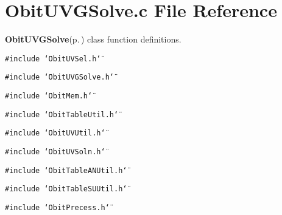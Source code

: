 \section{Obit\-UVGSolve.c File Reference}
\label{ObitUVGSolve_8c}
{\bf Obit\-UVGSolve}{\rm (p.\,\pageref{structObitUVGSolve})} class function definitions. 

{\tt \#include \char`\"{}Obit\-UVSel.h\char`\"{}}\par
{\tt \#include \char`\"{}Obit\-UVGSolve.h\char`\"{}}\par
{\tt \#include \char`\"{}Obit\-Mem.h\char`\"{}}\par
{\tt \#include \char`\"{}Obit\-Table\-Util.h\char`\"{}}\par
{\tt \#include \char`\"{}Obit\-UVUtil.h\char`\"{}}\par
{\tt \#include \char`\"{}Obit\-UVSoln.h\char`\"{}}\par
{\tt \#include \char`\"{}Obit\-Table\-ANUtil.h\char`\"{}}\par
{\tt \#include \char`\"{}Obit\-Table\-SUUtil.h\char`\"{}}\par
{\tt \#include \char`\"{}Obit\-Precess.h\char`\"{}}\par
